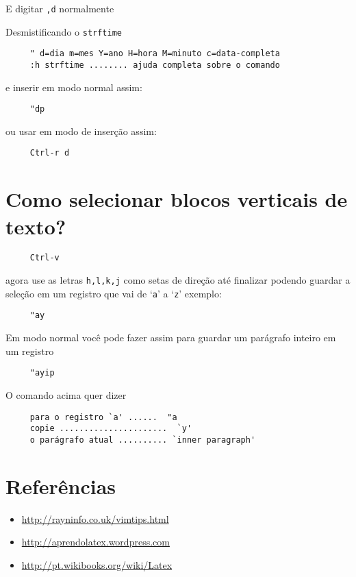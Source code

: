 E digitar {\tt ,d} normalmente

Desmistificando o {\tt strftime}
\begin{verbatim}
     " d=dia m=mes Y=ano H=hora M=minuto c=data-completa
     :h strftime ........ ajuda completa sobre o comando
\end{verbatim}

e inserir em modo normal assim:

\begin{verbatim}
     "dp
\end{verbatim}

ou usar em modo de inserção assim:

\begin{verbatim}
     Ctrl-r d
\end{verbatim}

\section{Como selecionar blocos verticais de texto?}
\label{Como selecionar blocos verticais de texto?}

\begin{verbatim}
     Ctrl-v
\end{verbatim}

agora use as letras {\tt h,l,k,j} como setas de direção até finalizar
podendo guardar a seleção em um registro que vai de `{\tt a}' a `{\tt z}' exemplo:

\begin{verbatim}
     "ay
\end{verbatim}

Em modo normal você pode fazer assim para guardar um parágrafo inteiro em um registro

\begin{verbatim}
     "ayip
\end{verbatim}

O comando acima quer dizer

\begin{verbatim}
     para o registro `a' ......  "a
     copie ......................  `y'
     o parágrafo atual .......... `inner paragraph'
\end{verbatim}

\section{Referências}
\label{Referências}

\begin{itemize}
   \item \url{http://rayninfo.co.uk/vimtips.html}
   \item \url{http://aprendolatex.wordpress.com}
   \item \url{http://pt.wikibooks.org/wiki/Latex}
\end{itemize}
